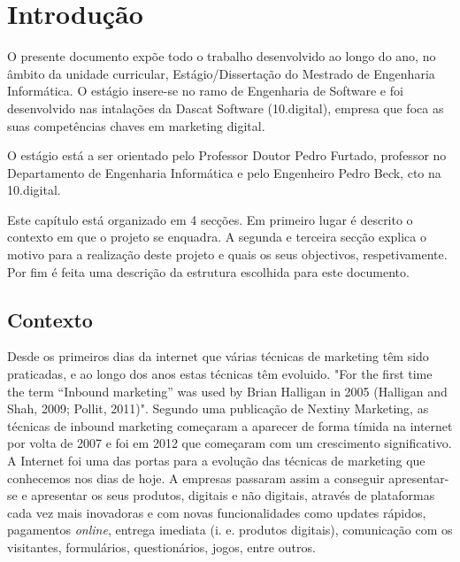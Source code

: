 \chapter{Introdução}
\label{sec:introducao}

O presente documento expõe todo o trabalho desenvolvido ao longo do ano, no âmbito da unidade curricular, Estágio/Dissertação do Mestrado de Engenharia Informática. O estágio insere-se no ramo de Engenharia de Software e foi desenvolvido nas intalações da Dascat Software (10.digital)\cite{10}, empresa que foca as suas competências chaves em marketing digital. 

O estágio está a ser orientado pelo Professor Doutor Pedro Furtado, professor no Departamento de Engenharia Informática e pelo Engenheiro Pedro Beck, \acrshort{cto} na 10.digital.

Este capítulo está organizado em 4 secções. Em primeiro lugar é descrito o contexto em que o projeto se enquadra. A segunda e terceira secção explica o motivo para a realização deste projeto e quais os seus objectivos, respetivamente. Por fim é feita uma descrição da estrutura escolhida para este documento.

\section{Contexto}
\label{subsec:contexto}

Desde os primeiros dias da internet que várias técnicas de marketing têm sido praticadas, e ao longo dos anos estas técnicas têm evoluido. "For the first time the term “Inbound marketing” was used by Brian Halligan in 2005 (Halligan and Shah, 2009; Pollit, 2011)"\cite{bookinbound}\cite{inbound_paper}. Segundo uma publicação de Nextiny Marketing\cite{postNextiny}, as técnicas de inbound marketing começaram a aparecer de forma tímida na internet por volta de 2007 e foi em 2012 que começaram com um crescimento significativo. A Internet foi uma das portas para a evolução das técnicas de marketing que conhecemos nos dias de hoje. A empresas passaram assim a conseguir apresentar-se e apresentar os seus produtos, digitais e não digitais, através de plataformas cada vez mais inovadoras e com novas funcionalidades como updates rápidos, pagamentos \textit{online}, entrega imediata (i. e. produtos digitais), comunicação com os visitantes, formulários, questionários, jogos, entre outros.  


